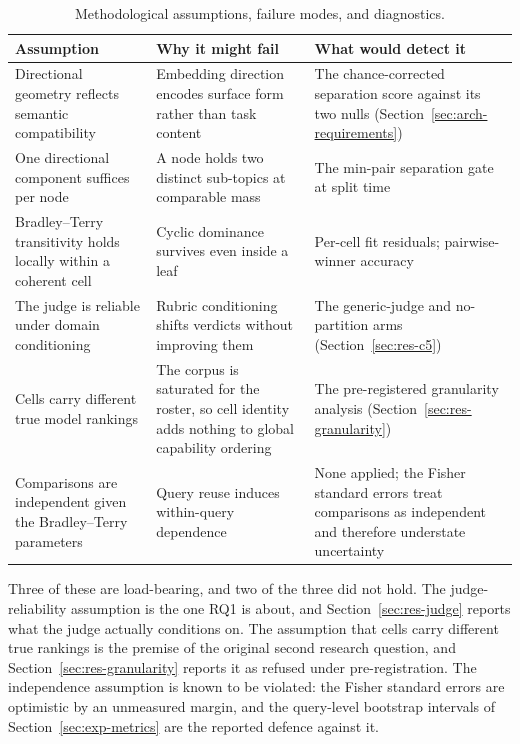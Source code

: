 \begin{table}[htbp]
    \centering
    \caption{Methodological assumptions, failure modes, and diagnostics.}
    \label{tab:meth-assumptions}
    \begin{tabular}{p{3.4cm}p{4.4cm}p{4.4cm}}
        \toprule
        Assumption & Why it might fail & What would detect it \\
        \midrule
        Directional geometry reflects semantic compatibility
        & Embedding direction encodes surface form rather than task
        content
        & The chance-corrected separation score against its two nulls
        (Section~\ref{sec:arch-requirements}) \\
        \addlinespace
        One directional component suffices per node
        & A node holds two distinct sub-topics at comparable mass
        & The min-pair separation gate at split time \\
        \addlinespace
        Bradley--Terry transitivity holds locally within a coherent cell
        & Cyclic dominance survives even inside a leaf
        & Per-cell fit residuals; pairwise-winner accuracy \\
        \addlinespace
        The judge is reliable under domain conditioning
        & Rubric conditioning shifts verdicts without improving them
        & The generic-judge and no-partition arms
        (Section~\ref{sec:res-c5}) \\
        \addlinespace
        Cells carry different true model rankings
        & The corpus is saturated for the roster, so cell identity adds
        nothing to global capability ordering
        & The pre-registered granularity analysis
        (Section~\ref{sec:res-granularity}) \\
        \addlinespace
        Comparisons are independent given the Bradley--Terry parameters
        & Query reuse induces within-query dependence
        & None applied; the Fisher standard errors treat comparisons as
        independent and therefore understate uncertainty \\
        \bottomrule
    \end{tabular}
\end{table}

Three of these are load-bearing, and two of the three did not hold.
The judge-reliability assumption is the one RQ1 is about, and
Section~\ref{sec:res-judge} reports what the judge actually conditions
on. The assumption that cells carry different true rankings is the
premise of the original second research question, and
Section~\ref{sec:res-granularity} reports it as refused under
pre-registration. The independence assumption is known to be violated:
the Fisher standard errors are optimistic by an unmeasured margin, and
the query-level bootstrap intervals of
Section~\ref{sec:exp-metrics} are the reported defence against it.


